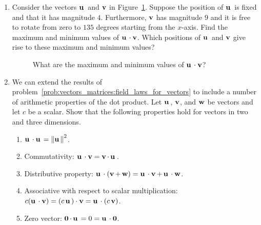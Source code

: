 \begin{enumerate}
\item Consider the vectors $\vecu$ and $\vecv$ in
  Figure~\ref{fig:vectors_matrices:maximum_minimum_dot_product}. Suppose
  the position of $\vecu$ is fixed and that it has magnitude
  $4$. Furthermore, $\vecv$ has magnitude $9$ and it is free to rotate
  from zero to $135$ degrees starting from the $x$-axis. Find the
  maximum and minimum values of $\vecu \cdot \vecv$. Which positions
  of $\vecu$ and $\vecv$ give rise to these maximum and minimum values?
%
\begin{figure}[!htpb]
\centering
{}
\caption{What are the maximum and minimum values of $\vecu \cdot \vecv$?}
\label{fig:vectors_matrices:maximum_minimum_dot_product}
\end{figure}

\item We can extend the results of
  problem~\ref{prob:vectors_matrices:field_laws_for_vectors} to
  include a number of arithmetic properties of the dot
  product. Let $\vecu$, $\vecv$, and $\vecw$ be vectors and let $c$ be
  a scalar. Show that the following properties hold for vectors in two
  and three dimensions.
  \begin{enumerate}
  \item $\vecu \cdot \vecu = \vecvertl \vecu \vecvertr^2$.

  \item Commutativity: $\vecu \cdot \vecv = \vecv \cdot \vecu$.

  \item Distributive property:
    $\vecu \cdot (\vecv + \vecw)
    =
    \vecu \cdot \vecv + \vecu \cdot \vecw$.

  \item Associative with respect to scalar multiplication:
    $c (\vecu \cdot \vecv)
    =
    (c \vecu) \cdot \vecv
    =
    \vecu \cdot (c \vecv)$.

  \item Zero vector:
    $\veczero \cdot \vecu = 0 = \vecu \cdot \veczero$.
  \end{enumerate}


\end{enumerate}
